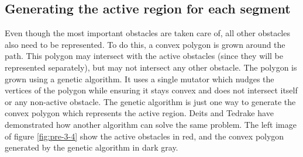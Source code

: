 \subsection{Generating the active region for each segment}
Even though the most important obstacles are taken care of, all other obstacles also need to be represented. To do this, a convex polygon is grown around the path. This polygon may intersect with the active obstacles (since they will be represented separately), but may not intersect any other obstacle. The polygon is grown using a genetic algorithm. It uses a single mutator which nudges the vertices of the polygon while ensuring it stays convex and does not intersect itself or any non-active obstacle. The genetic algorithm is just one way to generate the convex polygon which represents the active region. Deits and Tedrake \cite{Deits2015} have demonstrated how another algorithm can solve the same problem. The left image of figure \ref{fig:pre-3-4} show the active obstacles in red, and the convex polygon generated by the genetic algorithm in dark gray.

